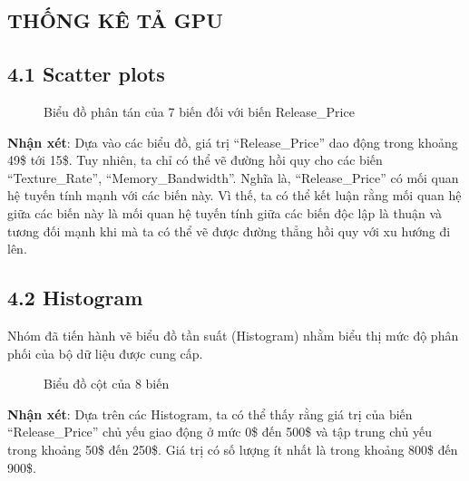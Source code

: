 \documentclass[a4paper]{article}
\newcommand{\gachdau}{\hspace*{1.5em}\ignorespaces}
\begin{document}
\newpage
    \begin{center}
        \section*{THỐNG KÊ TẢ GPU}
    \end{center}
        \subsection*{4.1 Scatter plots}
            \begin{figure}[!h]
                \centering
                
                
                
                
                
                
                
                \caption{Biểu đồ phân tán của 7 biến đối với biến Release\_Price}
            \end{figure}
            
\newpage
        \hspace{1pt}
        \fontsize{13pt}{15pt}\selectfont \textbf{Nhận xét}: Dựa vào các biểu đồ, giá trị “Release\_Price” dao động trong khoảng 49\$ tới 15\$. Tuy nhiên, ta chỉ có thể vẽ đường hồi quy cho các biến “Texture\_Rate”, “Memory\_Bandwidth”. Nghĩa là, “Release\_Price” có mối quan hệ tuyến tính mạnh với các biến này. Vì thế, ta có thể kết luận rằng mối quan hệ giữa các biến này là mối quan hệ tuyến tính giữa các biến độc lập là thuận và tương đối mạnh khi mà ta có thể vẽ được đường thẳng hồi quy với xu hướng đi lên.
            
        \subsection*{4.2 Histogram}
            \gachdau
            Nhóm đã tiến hành vẽ biểu đồ tần suất (Histogram) nhằm biểu thị mức độ phân phối của bộ dữ liệu được cung cấp.
            \begin{figure}[H]
                \vspace{3pt}
                \centering
                
                \caption{Biểu đồ cột của 8 biến}
            \end{figure}
            \vspace{-15pt}
            \hspace{1pt}
            \fontsize{13pt}{15pt}\selectfont \textbf{Nhận xét}: Dựa trên các Histogram, ta có thể thấy rằng giá trị của biến “Release\_Price” chủ yếu giao động ở mức 0\$ đến 500\$ và tập trung chủ yếu trong khoảng 50\$ đến 250\$. Giá trị có số lượng ít nhất là trong khoảng 800\$ đến 900\$.
\end{document}
